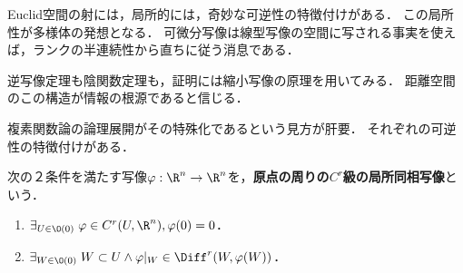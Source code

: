\documentclass[uplatex,dvipdfmx]{jsreport}
\begin{document}
\begin{tcolorbox}[colframe=ForestGreen, colback=ForestGreen!10!white,breakable,colbacktitle=ForestGreen!40!white,coltitle=black,fonttitle=\bfseries\sffamily,
title=]
    Euclid空間の射には，局所的には，奇妙な可逆性の特徴付けがある．
    この局所性が多様体の発想となる．
    可微分写像は線型写像の空間に写される事実を使えば，ランクの半連続性から直ちに従う消息である．

    逆写像定理も陰関数定理も，証明には縮小写像の原理を用いてみる．
    距離空間のこの構造が情報の根源であると信じる．

    複素関数論の論理展開がその特殊化であるという見方が肝要．
    それぞれの可逆性の特徴付けがある．
\end{tcolorbox}

\begin{definition}[局所同相]
    次の２条件を満たす写像$\varphi:\R^n\to\R^n$を，\textbf{原点の周りの$C^r$級の局所同相写像}という．
    \begin{enumerate}
        \item $\exists_{U\in\O(0)}\;\varphi\in C^r(U,\R^n),\varphi(0)=0$．
        \item $\exists_{W\in\O(0)}\;W\subset U\land \varphi|_W\in\Diff^r(W,\varphi(W))$．
    \end{enumerate}
\end{definition}
\end{document}

